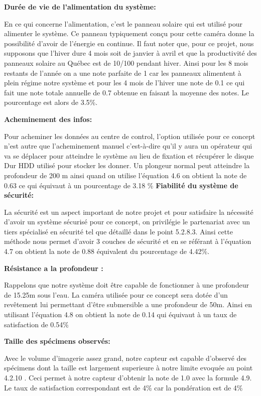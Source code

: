 \textbf{Durée de vie de l’alimentation du système:}

 En ce qui concerne l’alimentation, c’est le panneau solaire qui est utilisé pour alimenter le système. Ce panneau typiquement conçu pour cette caméra donne la possibilité d’avoir de l’énergie en continue. Il faut noter que, pour ce projet, nous supposons que l’hiver dure 4 mois soit de janvier à avril et que la productivité des panneaux solaire au Québec est de 10/100 pendant hiver. Ainsi pour les 8 mois restants de l’année on a une note parfaite de 1 car les panneaux alimentent à plein régime notre système et pour les 4 mois de l’hiver une note de 0.1  ce qui fait une note totale annuelle de 0.7 obtenue en faisant la moyenne des notes. Le pourcentage est alors de 3.5\%.
 
\textbf{Acheminement des infos:}

Pour acheminer les données au centre de control, l’option utilisée pour ce concept n’est autre que l’acheminement manuel c’est-à-dire qu’il y aura un opérateur qui va se déplacer pour atteindre le système au lieu de fixation et récupérer le disque Dur HDD utilisé pour stocker les donner. Un plongeur normal peut atteindre la profondeur de 200 m ainsi quand on utilise l’équation 4.6 on obtient la note de 0.63 ce qui équivaut à un pourcentage de 3.18 \%
\textbf{Fiabilité du système de sécurité:}

La sécurité est un aspect important de notre projet et pour satisfaire la nécessité d’avoir un système sécurisé pour ce concept, on privilégie le partenariat avec un tiers spécialisé en sécurité tel que détaillé dans le point 5.2.8.3. Ainsi cette méthode nous permet d’avoir 3  couches de sécurité et en se référant à l’équation 4.7 on obtient la note de 0.88 équivalent du pourcentage de 4.42\%.

\textbf{Résistance a la profondeur :}

Rappelons que notre système doit être capable de fonctionner à une profondeur de 15.25m sous l’eau. La caméra utilisée pour ce concept sera dotée d’un revêtement lui permettant d’être submersible a une profondeur de 50m. Ainsi en utilisant l’équation 4.8 on obtient la note de 0.14 qui équivaut à un taux de satisfaction de 0.54\%

\textbf{Taille des spécimens observés:}

Avec le volume d’imagerie assez grand, notre capteur est capable d’observé des spécimens dont la taille est largement superieure à notre limite evoquée au point 4.2.10 . Ceci permet à notre capteur d’obtenir la note de 1.0 avec la formule 4.9. Le taux de satisfaction correspondant est de 4\% car la pondération est de 4\%

